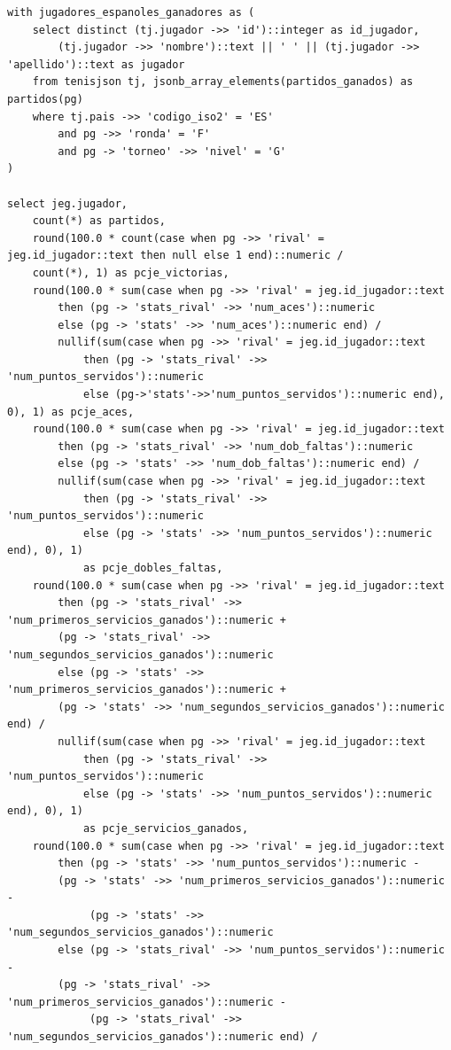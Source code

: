 \begin{verbatim}
with jugadores_espanoles_ganadores as (
    select distinct (tj.jugador ->> 'id')::integer as id_jugador, 
    	(tj.jugador ->> 'nombre')::text || ' ' || (tj.jugador ->> 'apellido')::text as jugador
    from tenisjson tj, jsonb_array_elements(partidos_ganados) as partidos(pg)
    where tj.pais ->> 'codigo_iso2' = 'ES'
        and pg ->> 'ronda' = 'F'
        and pg -> 'torneo' ->> 'nivel' = 'G'
)

select jeg.jugador,
    count(*) as partidos,
    round(100.0 * count(case when pg ->> 'rival' = jeg.id_jugador::text then null else 1 end)::numeric / 
	count(*), 1) as pcje_victorias,
    round(100.0 * sum(case when pg ->> 'rival' = jeg.id_jugador::text 
    	then (pg -> 'stats_rival' ->> 'num_aces')::numeric 
    	else (pg -> 'stats' ->> 'num_aces')::numeric end) / 
    	nullif(sum(case when pg ->> 'rival' = jeg.id_jugador::text 
    		then (pg -> 'stats_rival' ->> 'num_puntos_servidos')::numeric 
    		else (pg->'stats'->>'num_puntos_servidos')::numeric end), 0), 1) as pcje_aces,
    round(100.0 * sum(case when pg ->> 'rival' = jeg.id_jugador::text 
    	then (pg -> 'stats_rival' ->> 'num_dob_faltas')::numeric 
    	else (pg -> 'stats' ->> 'num_dob_faltas')::numeric end) / 
    	nullif(sum(case when pg ->> 'rival' = jeg.id_jugador::text 
    		then (pg -> 'stats_rival' ->> 'num_puntos_servidos')::numeric 
    		else (pg -> 'stats' ->> 'num_puntos_servidos')::numeric end), 0), 1) 
			as pcje_dobles_faltas,
    round(100.0 * sum(case when pg ->> 'rival' = jeg.id_jugador::text 
    	then (pg -> 'stats_rival' ->> 'num_primeros_servicios_ganados')::numeric + 
		(pg -> 'stats_rival' ->> 'num_segundos_servicios_ganados')::numeric 
    	else (pg -> 'stats' ->> 'num_primeros_servicios_ganados')::numeric + 
		(pg -> 'stats' ->> 'num_segundos_servicios_ganados')::numeric end) / 
    	nullif(sum(case when pg ->> 'rival' = jeg.id_jugador::text 
    		then (pg -> 'stats_rival' ->> 'num_puntos_servidos')::numeric 
    		else (pg -> 'stats' ->> 'num_puntos_servidos')::numeric end), 0), 1) 
			as pcje_servicios_ganados,
    round(100.0 * sum(case when pg ->> 'rival' = jeg.id_jugador::text 
    	then (pg -> 'stats' ->> 'num_puntos_servidos')::numeric - 
		(pg -> 'stats' ->> 'num_primeros_servicios_ganados')::numeric - 
    		 (pg -> 'stats' ->> 'num_segundos_servicios_ganados')::numeric 
    	else (pg -> 'stats_rival' ->> 'num_puntos_servidos')::numeric - 
		(pg -> 'stats_rival' ->> 'num_primeros_servicios_ganados')::numeric - 
    		 (pg -> 'stats_rival' ->> 'num_segundos_servicios_ganados')::numeric end) / 	

\end{verbatim}
